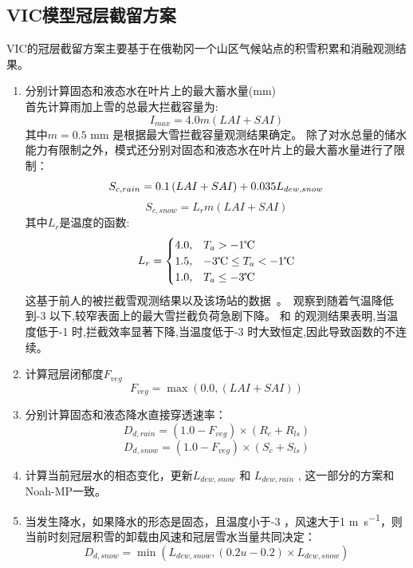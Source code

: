 \subsection{VIC模型冠层截留方案}
VIC的冠层截留方案\citep{liang1994simple,hamman2018variable}主要基于\citet{storck2002measurement}在俄勒冈一个山区气候站点的积雪积累和消融观测结果。
\begin{enumerate}
\item 分别计算固态和液态水在叶片上的最大蓄水量(mm)\\
首先计算雨加上雪的总最大拦截容量为:
\begin{equation}
I_{max} = 4.0 m (LAI+SAI)
\end{equation}
其中$m=0.5$ mm 是根据最大雪拦截容量观测结果确定。
除了对水总量的储水能力有限制之外，模式还分别对固态和液态水在叶片上的最大蓄水量进行了限制：
\begin{equation}
S_{c,rain}=0.1\left(LAI+SAI\right)+0.035 L_{dew,snow}\\
\end{equation}
\begin{equation}
S_{c,snow}=L_r m (LAI+SAI)
\end{equation}
其中$L_r$是温度的函数:
\begin{equation}
L_r = \begin{cases}
           4.0, & T_a > -1 \text{\textcelsius}\\
            1.5, & -3 \text{\textcelsius} \leq T_a < -1 \text{\textcelsius}\\
           1.0, & T_a \leq -3 \text{\textcelsius}
         \end{cases}
\end{equation}
这基于前人的被拦截雪观测结果以及该场站的数据~\citep{storck2002measurement}。\citet{kobayashi1987snow}~观察到随着气温降低到-3 \textcelsius 以下,较窄表面上的最大雪拦截负荷急剧下降。 \citet{kobayashi1987snow}和 \citet{pfister1999snow}的观测结果表明,当温度低于-1 \textcelsius 时,拦截效率显著下降,当温度低于-3 \textcelsius 时大致恒定,因此导致函数的不连续。
\item 计算冠层闭郁度$F_{veg}$
\begin{equation}
F_{veg} = \max(0.0,\left(LAI+SAI\right))
\end{equation}
\item 分别计算固态和液态降水直接穿透速率：
\begin{equation}
D_{d,rain}=\left(1.0-F_{veg}\right) \times (R_{c}+R_{ls})
\end{equation}
\begin{equation}
D_{d,snow}=\left(1.0-F_{veg}\right) \times (S_{c}+S_{ls})
\end{equation}
\item 计算当前冠层水的相态变化，更新$L_{dew,snow}$ 和 $L_{dew,rain}$ , 这一部分的方案和Noah-MP一致。
\item 当发生降水，如果降水的形态是固态，且温度小于-3 \textcelsius ，风速大于1 \unit{m.s^{-1}}，则当前时刻冠层积雪的卸载由风速和冠层雪水当量共同决定：
\begin{equation}
D_{d,snow} = \min(L_{dew,snow}, \left(0.2u-0.2\right) \times L_{dew,snow})
\end{equation}


\end{enumerate}
